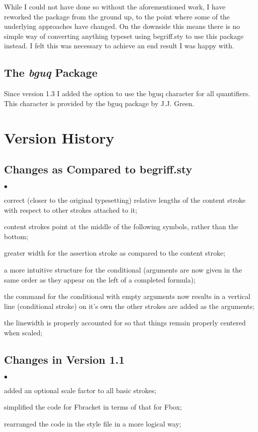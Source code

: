 \documentclass[12pt]{article}
\newcommand{\squishlist}{
  \begin{list}{$\bullet$}{
    \setlength{\itemsep}{0pt}
    \setlength{\parsep}{0pt}
    \setlength{\topsep}{0pt}
    \setlength{\partopsep}{0pt}
    \setlength{\leftmargin}{1em}
    \setlength{\labelwidth}{1em}
    \setlength{\parskip}{0pt}
    \setlength{\partopsep}{0pt}
    \setlength{\rightmargin}{0pt}
    \setlength{\labelsep}{0.5em}}}
\newcommand{\squishlistend}{\end{list}}
\begin{document}
  While I could not have done so without the aforementioned work, I have reworked the 
  package from the ground up, to the point where some of the underlying approaches 
  have changed. On the downside this means there is no simple way of converting 
  anything typeset using begriff.sty to use this package instead. I felt this was 
  necessary to achieve an end result I was happy with.

\subsection{The \emph{bguq} Package}
  Since version 1.3 I added the option to use the bguq character for all 
  quantifiers. This character is provided by the bguq package by J.J. Green.

\section{Version History}
\subsection{Changes as Compared to begriff.sty}
  \squishlist
    \item correct (closer to the original typesetting) relative lengths of the 
      content stroke with respect to other strokes attached to it;
    \item content strokes point at the middle of the following symbols, rather 
      than the bottom;
    \item greater width for the assertion stroke as compared to the content stroke;
    \item a more intuitive structure for the conditional (arguments are now given in 
      the same order as they appear on the left of a completed formula);
    \item the command for the conditional with empty arguments now results in a 
      vertical line (conditional stroke) on it's own the other strokes are added as   
      the arguments;
    \item the linewidth is properly accounted for so that things remain properly 
      centered when scaled;
  \squishlistend

\subsection{Changes in Version 1.1}
  \squishlist
    \item added an optional scale factor to all basic strokes;
    \item simplified the code for Fbracket in terms of that for Fbox;
    \item rearranged the code in the style file in a more logical way;
  \squishlistend
\end{document}
